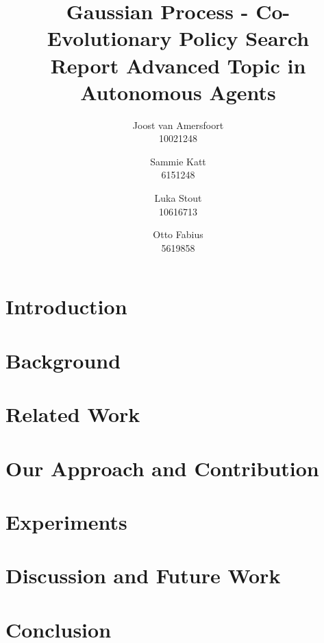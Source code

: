 \documentclass{article}
\title{Gaussian Process - Co-Evolutionary Policy Search \\ {\large Report Advanced Topic in Autonomous Agents}}
\author{Joost van Amersfoort \\ 10021248 \and Sammie Katt \\ 6151248 \and Luka Stout \\ 10616713 \and Otto Fabius \\ 5619858}
\begin{document}
\maketitle
\tableofcontents
\newpage

\section{Introduction}


\section{Background}\label{background}


\section{Related Work}\label{related}


\section{Our Approach and Contribution}\label{contrib}


\section{Experiments}\label{experiments}



\section{Discussion and Future Work}\label{discussion}



\section{Conclusion}\label{conclusion}


\pagebreak 
\nocite{*}


\end{document}
